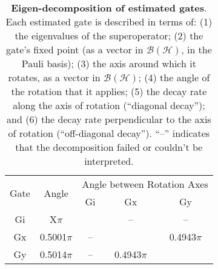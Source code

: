 {\begin{table}[h]
\begin{center}
\vspace{2em}
\begin{tabular}[l]{|c|c|c|c|c|}
\hline
\multirow{2}{*}{Gate} & \multirow{2}{*}{Angle} & \multicolumn{3}{c|}{Angle between Rotation Axes} \\ \cline{3-5}
 & & Gi & Gx & Gy \\ \hline
Gi & X$\pi$ &  & -- & -- \\ \hline
Gx & 0.5001$\pi$ & -- &  & 0.4943$\pi$ \\ \hline
Gy & 0.5014$\pi$ & -- & 0.4943$\pi$ &  \\ \hline
\end{tabular}

\caption{\textbf{Eigen-decomposition of estimated gates}.  Each estimated gate is described in terms of: (1) the eigenvalues of the superoperator; (2) the gate's fixed point (as a vector in $\mathcal{B}(\mathcal{H})$, in the Pauli basis); (3)  the axis around which it rotates, as a vector in $\mathcal{B}(\mathcal{H})$; (4) the angle of the rotation that it applies; (5) the decay rate along the axis of rotation (``diagonal decay''); and (6) the decay rate perpendicular to the axis of rotation (``off-diagonal decay'').  ``--'' indicates that the decomposition failed or couldn't be interpreted. \label{bestTargetGatesGatesetDecompTable}}
\end{center}
\end{table}


}
